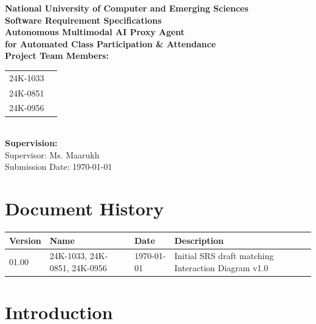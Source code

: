 \documentclass[12pt]{article}
\begin{document}
\begin{titlepage}
    \centering
    \vspace*{0.5in}
    {\large \textbf{National University of Computer and Emerging Sciences}} \\
    \vspace{1in}
    {\Huge \textbf{Software Requirement Specifications}} \\
    \vspace{0.5in}
    {\LARGE \textbf{Autonomous Multimodal AI Proxy Agent \\ for Automated Class Participation \& Attendance}} \\
    \vspace{1in}
    \textbf{Project Team Members:} \\
    \vspace{0.2in}
    \begin{tabular}{ll}
        24K-1033  \\
        24K-0851 \\
        24K-0956 \\
    \end{tabular} \\
    \vspace{1in}
    \textbf{Supervision:} \\
    Supervisor: Ms. Maarukh \\
    \vfill
    Submission Date: \today
\end{titlepage}

\newpage

\section*{Document History}
\begin{tabular}{|p{2cm}|p{4cm}|p{3cm}|p{5cm}|}
\hline
\textbf{Version} & \textbf{Name} & \textbf{Date} & \textbf{Description} \\ \hline
01.00 & 24K-1033, 24K-0851, 24K-0956 & \today & Initial SRS draft matching Interaction Diagram v1.0 \\ \hline
\end{tabular}

\newpage
\tableofcontents
\newpage

\section{Introduction}
\end{document}
